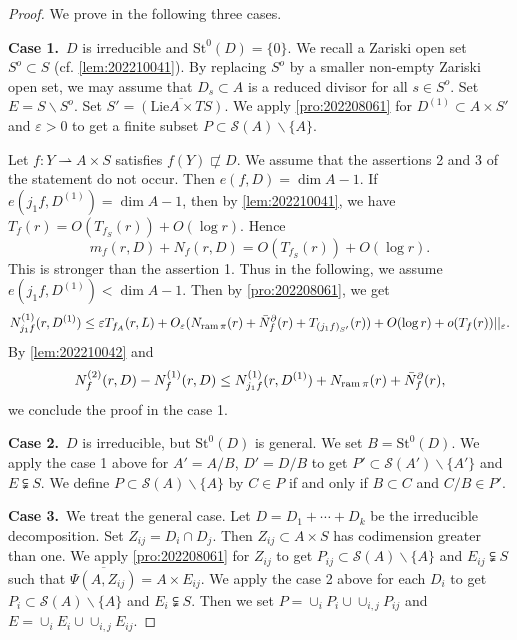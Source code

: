 \documentclass[11pt,english]{smfart}
\theoremstyle{plain}
\theoremstyle{definition}
\theoremstyle{remark}
\numberwithin{equation}{section}
\theoremstyle{plain}
\newcommand{\da}{\rightharpoonup}
\newcommand{\pN}[1]{\bar{N}_{#1}^{\partial}}
\newcommand{\ram}{{\rm ram}\,}
\begin{document}
	
	\begin{proof}
		We prove in the following three cases.
		
		\textbf{Case 1.}\ 
		$D$ is irreducible and $\mathrm{St}^0(D)=\{0\}$.
		We recall a Zariski open set $S^o\subset S$ (cf. \cref{lem:202210041}).
		By replacing $S^o$ by a smaller non-empty Zariski open set, we may assume that $D_s\subset A$ is a reduced divisor for all $s\in S^o$.
		Set $E=S\backslash S^o$.
		Set $S'=\overline{(\mathrm{Lie}A\times TS)}$. 	
		We apply \cref{pro:202208061} for $D^{(1)}\subset A\times S'$ and $\varepsilon>0$ to get a finite subset $P\subset \mathcal{S}(A)\backslash\{A\}$.
		
		Let $f:Y\da A\times S$ satisfies $f(Y)\not\sqsubset D$.
		We assume that the assertions 2 and 3 of the statement do not occur.
		Then $e(f,D)=\dim A-1$.
		If $e(j_1f,D^{(1)})= \dim A-1$, then by \cref{lem:202210041}, we have $T_f(r)=O(T_{f_{S}}(r))+O(\log r)$.
		Hence
		$$
		m_f(r,D)+N_f(r,D)=O(T_{f_S}(r))+O(\log r).
		$$
		This is stronger than the assertion 1.
		Thus in the following, we assume $e(j_1f,D^{(1)})<\dim A-1$.
		Then by \cref{pro:202208061}, we get
		$$
		N^{(1)}_{j_1f}(r,D^{(1)})\leq \varepsilon T_{f_A}(r,L)+O_{\varepsilon}(N_{\ram\pi}(r)+\pN{f}(r)
		+T_{(j_1f)_{S'}}(r))+O(\log r)+o(T_f(r))||_{\varepsilon}.
		$$
		By  \cref{lem:202210042} and
		$$
		N^{(2)}_f(r,D)-N^{(1)}_f(r,D)\leq N^{(1)}_{j_1f}(r,D^{(1)})+N_{\ram\pi}(r)+\pN{f}(r),
		$$
		we conclude the proof in the case 1.
		
		\textbf{Case 2.}\
		$D$ is irreducible, but $\mathrm{St}^0(D)$ is general.
		We set $B=\mathrm{St}^0(D)$.
		We apply the case 1 above for $A'=A/B$, $D'=D/B$ to get $P'\subset \mathcal{S}(A')\backslash\{ A'\}$ and $E\subsetneqq S$.
		We define $P\subset \mathcal{S}(A)\backslash \{A\}$ by $C\in P$ if and only if $B\subset C$ and $C/B\in P'$.
		
		\textbf{Case 3.}\
		We treat the general case.
		Let $D=D_1+\cdots+D_k$ be the irreducible decomposition.
		Set $Z_{ij}=D_i\cap D_j$.
		Then $Z_{ij}\subset A\times S$ has codimension greater than one.
		We apply \cref{pro:202208061} for $Z_{ij}$ to get $P_{ij}\subset \mathcal{S}(A)\backslash \{A\}$ and $E_{ij}\subsetneqq S$ such that $\overline{\Psi(A,Z_{ij})}=A\times E_{ij}$.
		We apply the case 2 above for each $D_i$ to get $P_i\subset \mathcal{S}(A)\backslash \{A\}$ and $E_i\subsetneqq S$.
		Then we set $P=\cup_iP_i\cup \cup_{i,j}P_{ij}$ and $E=\cup_{i}E_i\cup \cup_{i,j}E_{ij}$.
	\end{proof}
	
\end{document}
